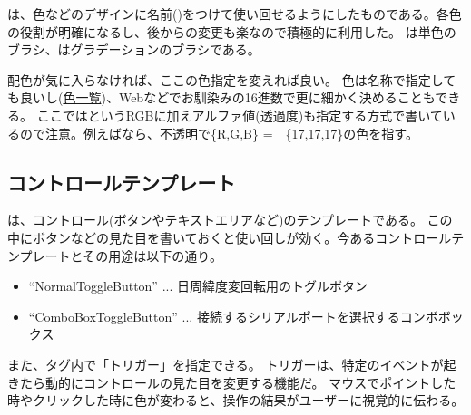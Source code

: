 \documentclass[letterpaper,10pt,dvipdfmx]{sphinxmanual}
\begin{document}
 は、色などのデザインに名前()をつけて使い回せるようにしたものである。各色の役割が明確になるし、後からの変更も楽なので積極的に利用した。
は単色のブラシ、はグラデーションのブラシである。

配色が気に入らなければ、ここの色指定を変えれば良い。
色は名称で指定しても良いし(\href{http://www.atmarkit.co.jp/fdotnet/dotnettips/1071colorname/colorname.html\#colorsample}{色一覧})、Webなどでお馴染みの16進数で更に細かく決めることもできる。
ここではというRGBに加えアルファ値(透過度)も指定する方式で書いているので注意。例えばなら、不透明で\{R,G,B\} =　\{17,17,17\}の色を指す。


\subsection{コントロールテンプレート}
\label{\detokenize{nissyu-idohen/pc-software-code:}}\label{\detokenize{nissyu-idohen/pc-software-code:id4}}
 は、コントロール(ボタンやテキストエリアなど)のテンプレートである。
この中にボタンなどの見た目を書いておくと使い回しが効く。今あるコントロールテンプレートとその用途は以下の通り。
\begin{itemize}
\item {} 
``NormalToggleButton'' ... 日周緯度変回転用のトグルボタン

\item {} 
``ComboBoxToggleButton'' ... 接続するシリアルポートを選択するコンボボックス

\end{itemize}

また、タグ内で「トリガー」を指定できる。
トリガーは、特定のイベントが起きたら動的にコントロールの見た目を変更する機能だ。
マウスでポイントした時やクリックした時に色が変わると、操作の結果がユーザーに視覚的に伝わる。
\end{document}
